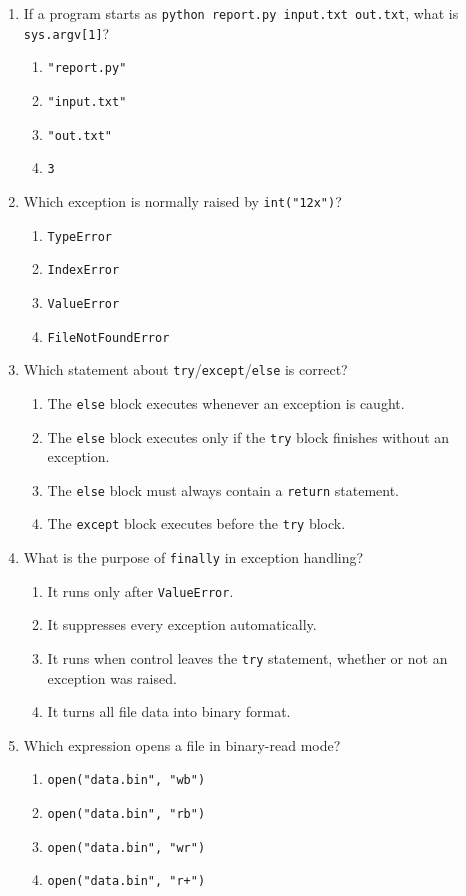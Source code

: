 \documentclass[11pt,a4paper]{article}
\begin{document}
\newpage
\begin{enumerate}[label=\textbf{Q\arabic*.},leftmargin=2em,itemsep=1.5pt,topsep=1pt,resume]
\item If a program starts as \texttt{python report.py input.txt out.txt}, what is \texttt{sys.argv[1]}?
\begin{enumerate}[label=\Alph*.,leftmargin=2em]
\item \texttt{"report.py"} \item \texttt{"input.txt"} \item \texttt{"out.txt"} \item \texttt{3}
\end{enumerate}
\item Which exception is normally raised by \texttt{int("12x")}?
\begin{enumerate}[label=\Alph*.,leftmargin=2em]
\item \texttt{TypeError} \item \texttt{IndexError} \item \texttt{ValueError} \item \texttt{FileNotFoundError}
\end{enumerate}
\item Which statement about \texttt{try}/\texttt{except}/\texttt{else} is correct?
\begin{enumerate}[label=\Alph*.,leftmargin=2em]
\item The \texttt{else} block executes whenever an exception is caught.
\item The \texttt{else} block executes only if the \texttt{try} block finishes without an exception.
\item The \texttt{else} block must always contain a \texttt{return} statement.
\item The \texttt{except} block executes before the \texttt{try} block.
\end{enumerate}
\item What is the purpose of \texttt{finally} in exception handling?
\begin{enumerate}[label=\Alph*.,leftmargin=2em]
\item It runs only after \texttt{ValueError}.
\item It suppresses every exception automatically.
\item It runs when control leaves the \texttt{try} statement, whether or not an exception was raised.
\item It turns all file data into binary format.
\end{enumerate}
\item Which expression opens a file in binary-read mode?
\begin{enumerate}[label=\Alph*.,leftmargin=2em]
\item \texttt{open("data.bin", "wb")} \item \texttt{open("data.bin", "rb")}
\item \texttt{open("data.bin", "wr")} \item \texttt{open("data.bin", "r+")}
\end{enumerate}
\end{enumerate}
\end{document}
